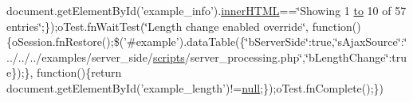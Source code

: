 \begin{DoxyCompactItemize}
document.\+get\+Element\+By\+Id('example\+\_\+info').\hyperlink{jquery-ui_8js_a87f73c4f0391c1cf9fe60374a76d9a7b}{inner\+H\+T\+M\+L}==\char`\"{}Showing 1 \hyperlink{jquery-ui_8js_af6086621f45baa2cf538f19e45d3c263}{to} 10 of 57 entries\char`\"{};\});o\+Test.\+fn\+Wait\+Test(\char`\"{}Length change enabled override\char`\"{}, function()\{o\+Session.\+fn\+Restore();\$('\#example').data\+Table(\{\char`\"{}b\+Server\+Side\char`\"{}\+:true,\char`\"{}s\+Ajax\+Source\char`\"{}\+:\char`\"{}../../../examples/server\+\_\+side/\hyperlink{tinymce_8jquery_8dev_8js_a09066d4d580eeec222f858d588b4cdef}{scripts}/server\+\_\+processing.\+php\char`\"{},\char`\"{}b\+Length\+Change\char`\"{}\+:true\});\}, function()\{return document.\+get\+Element\+By\+Id('example\+\_\+length')!=\hyperlink{validate_8js_afb8e110345c45e74478894341ab6b28e}{null};\});o\+Test.\+fn\+Complete();\})
\end{DoxyCompactItemize}


